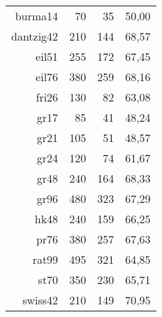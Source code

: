 \begin{table}[!htbp]
\begin{tabular}{||r|r|r|r||}
		burma14       & 70                                & 35                               & 50,00                                                \\
		dantzig42     & 210                               & 144                              & 68,57                                                \\
		eil51         & 255                               & 172                              & 67,45                                                \\
		eil76         & 380                               & 259                              & 68,16                                                \\
		fri26         & 130                               & 82                               & 63,08                                                \\
		gr17          & 85                                & 41                               & 48,24                                                \\
		gr21          & 105                               & 51                               & 48,57                                                \\
		gr24          & 120                               & 74                               & 61,67                                                \\
		gr48          & 240                               & 164                              & 68,33                                                \\
		gr96          & 480                               & 323                              & 67,29                                                \\
		hk48          & 240                               & 159                              & 66,25                                                \\
		pr76          & 380                               & 257                              & 67,63                                                \\
		rat99         & 495                               & 321                              & 64,85                                                \\
		st70          & 350                               & 230                              & 65,71                                                \\
		swiss42       & 210                               & 149                              & 70,95                                                \\

\end{tabular}
\end{table}
